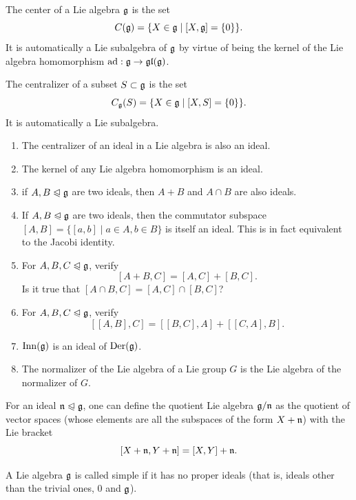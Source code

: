 \begin{defn}
    The center of a Lie algebra $\mathfrak{g}$ is the set
    \[C(\mathfrak{g})=\{X\in\mathfrak{g}\mid [X,\mathfrak{g}]=\{0\}\}.\]
    It is automatically a Lie subalgebra of $\mathfrak{g}$ by virtue of being the kernel of the Lie algebra homomorphism $\mathrm{ad}:\mathfrak{g}\to \mathfrak{gl}(\mathfrak{g})$.
\end{defn}

\begin{defn}[Centralizer]
    The centralizer of a subset $S\subset\mathfrak{g}$ is the set
    \[C_{\mathfrak{g}}(S)=\{X\in\mathfrak{g}\mid [X,S]=\{0\}\}.\]
    It is automatically a Lie subalgebra.
\end{defn}

\begin{xca}
\begin{enumerate}
    \item The centralizer of an ideal in a Lie algebra is also an ideal.
    \item The kernel of any Lie algebra homomorphism is an ideal.
    \item if $A,B\trianglelefteqslant\mathfrak{g}$ are two ideals, then $A+B$ and $A\cap B$ are also ideals.
    \item If $A,B\trianglelefteqslant \mathfrak{g}$ are two ideals, then the commutator subspace $[A,B]=\{[a,b]\mid a\in A,b\in B\}$ is itself an ideal. This is in fact equivalent to the Jacobi identity.
    \item For $A,B,C\trianglelefteqslant \mathfrak{g}$, verify
    \[[A+B,C]=[A,C]+[B,C].\]
    Is it true that $[A\cap B,C]=[A,C]\cap [B,C]$?
    \item For $A,B,C\trianglelefteqslant \mathfrak{g}$, verify
    \[[[A,B],C]=[[B,C],A]+[[C,A],B].\]
    \item $\operatorname{Inn}(\mathfrak{g})$ is an ideal of $\operatorname{Der}(\mathfrak{g})$.
    \item The normalizer of the Lie algebra of a Lie group $G$ is the Lie algebra of the normalizer of $G$.
\end{enumerate}
\end{xca}

\begin{defn}
    For an ideal $\mathfrak{n}\trianglelefteqslant\mathfrak{g}$, one can define the quotient Lie algebra $\mathfrak{g}\slash \mathfrak{n}$ as the quotient of vector spaces (whose elements are all the subspaces of the form $X+\mathfrak{n}$) with the Lie bracket
    \[[X+\mathfrak{n},Y+\mathfrak{n}]=[X,Y]+\mathfrak{n}.\]
\end{defn}

\begin{defn}
    A Lie algebra $\mathfrak{g}$ is called simple if it has no proper ideals (that is, ideals other than the trivial ones, $0$ and $\mathfrak{g}$).
\end{defn}


